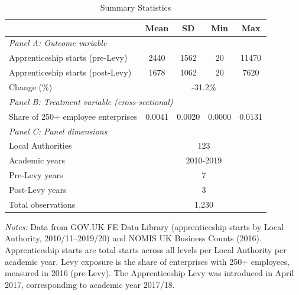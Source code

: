 \begin{table}[htbp]
\centering
\caption{Summary Statistics}
\label{tab:summary}
\small
\begin{tabular}{lcccc}
\hline\hline
 & Mean & SD & Min & Max \\
\hline
\multicolumn{5}{l}{\textit{Panel A: Outcome variable}} \\
Apprenticeship starts (pre-Levy) & 2440 & 1562 & 20 & 11470 \\
Apprenticeship starts (post-Levy) & 1678 & 1062 & 20 & 7620 \\
Change (\%) & \multicolumn{4}{c}{-31.2\%} \\
[4pt]
\multicolumn{5}{l}{\textit{Panel B: Treatment variable (cross-sectional)}} \\
Share of 250+ employee enterprises & 0.0041 & 0.0020 & 0.0000 & 0.0131 \\
[4pt]
\multicolumn{5}{l}{\textit{Panel C: Panel dimensions}} \\
Local Authorities & \multicolumn{4}{c}{123} \\
Academic years & \multicolumn{4}{c}{2010-2019} \\
Pre-Levy years & \multicolumn{4}{c}{7} \\
Post-Levy years & \multicolumn{4}{c}{3} \\
Total observations & \multicolumn{4}{c}{1,230} \\
\hline\hline
\end{tabular}
\begin{tablenotes}\small
\item \textit{Notes:} Data from GOV.UK FE Data Library (apprenticeship starts by Local Authority, 2010/11--2019/20) and NOMIS UK Business Counts (2016). Apprenticeship starts are total starts across all levels per Local Authority per academic year. Levy exposure is the share of enterprises with 250+ employees, measured in 2016 (pre-Levy). The Apprenticeship Levy was introduced in April 2017, corresponding to academic year 2017/18.
\end{tablenotes}
\end{table}

